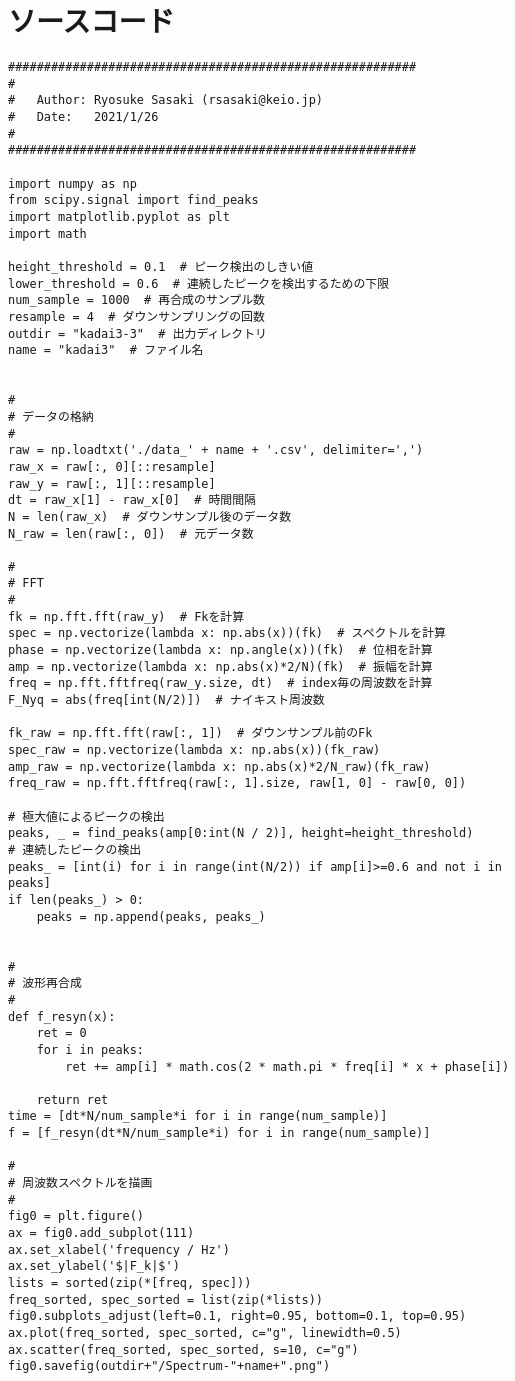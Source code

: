 \section{ソースコード}
\begin{lstlisting}[caption=FFT用pythonスクリプト,label=script]
#########################################################
#
#   Author: Ryosuke Sasaki (rsasaki@keio.jp)
#   Date:   2021/1/26
#
#########################################################

import numpy as np
from scipy.signal import find_peaks
import matplotlib.pyplot as plt
import math

height_threshold = 0.1  # ピーク検出のしきい値
lower_threshold = 0.6  # 連続したピークを検出するための下限
num_sample = 1000  # 再合成のサンプル数
resample = 4  # ダウンサンプリングの回数
outdir = "kadai3-3"  # 出力ディレクトリ
name = "kadai3"  # ファイル名


#
# データの格納
#
raw = np.loadtxt('./data_' + name + '.csv', delimiter=',')
raw_x = raw[:, 0][::resample]
raw_y = raw[:, 1][::resample]
dt = raw_x[1] - raw_x[0]  # 時間間隔
N = len(raw_x)  # ダウンサンプル後のデータ数
N_raw = len(raw[:, 0])  # 元データ数

#
# FFT
#
fk = np.fft.fft(raw_y)  # Fkを計算
spec = np.vectorize(lambda x: np.abs(x))(fk)  # スペクトルを計算
phase = np.vectorize(lambda x: np.angle(x))(fk)  # 位相を計算
amp = np.vectorize(lambda x: np.abs(x)*2/N)(fk)  # 振幅を計算
freq = np.fft.fftfreq(raw_y.size, dt)  # index毎の周波数を計算
F_Nyq = abs(freq[int(N/2)])  # ナイキスト周波数

fk_raw = np.fft.fft(raw[:, 1])  # ダウンサンプル前のFk
spec_raw = np.vectorize(lambda x: np.abs(x))(fk_raw)
amp_raw = np.vectorize(lambda x: np.abs(x)*2/N_raw)(fk_raw)
freq_raw = np.fft.fftfreq(raw[:, 1].size, raw[1, 0] - raw[0, 0])

# 極大値によるピークの検出
peaks, _ = find_peaks(amp[0:int(N / 2)], height=height_threshold)
# 連続したピークの検出
peaks_ = [int(i) for i in range(int(N/2)) if amp[i]>=0.6 and not i in peaks]
if len(peaks_) > 0:
    peaks = np.append(peaks, peaks_)


#
# 波形再合成
#
def f_resyn(x):
    ret = 0
    for i in peaks:
        ret += amp[i] * math.cos(2 * math.pi * freq[i] * x + phase[i])

    return ret
time = [dt*N/num_sample*i for i in range(num_sample)]
f = [f_resyn(dt*N/num_sample*i) for i in range(num_sample)]

#
# 周波数スペクトルを描画
#
fig0 = plt.figure()
ax = fig0.add_subplot(111)
ax.set_xlabel('frequency / Hz')
ax.set_ylabel('$|F_k|$')
lists = sorted(zip(*[freq, spec]))
freq_sorted, spec_sorted = list(zip(*lists))
fig0.subplots_adjust(left=0.1, right=0.95, bottom=0.1, top=0.95)
ax.plot(freq_sorted, spec_sorted, c="g", linewidth=0.5)
ax.scatter(freq_sorted, spec_sorted, s=10, c="g")
fig0.savefig(outdir+"/Spectrum-"+name+".png")


\end{lstlisting}
